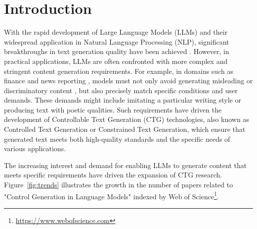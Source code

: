 \documentclass[acmsmall, screen]{acmart}
\begin{document}



\maketitle

\section{Introduction}

With the rapid development of Large Language Models (LLMs) and their widespread application in Natural Language Processing (NLP), significant breakthroughs in text generation quality have been achieved \cite{zhao_arxiv23_LLMSurvey}. However, in practical applications, LLMs are often confronted with more complex and stringent content generation requirements. For example, in domains such as finance \cite{lee_arxiv24_surveyFinLLMs} and news reporting \cite{liang_arxiv24_UHGEval}, models must not only avoid generating misleading or discriminatory content \cite{bender_FACCT21_dangers}, but also precisely match specific conditions and user demands. These demands might include imitating a particular writing style or producing text with poetic qualities. Such requirements have driven the development of Controllable Text Generation (CTG) technologies, also known as Controlled Text Generation or Constrained Text Generation, which ensure that generated text meets both high-quality standards and the specific needs of various applications.

The increasing interest and demand for enabling LLMs to generate content that meets specific requirements have driven the expansion of CTG research. Figure~\ref{fig:trends} illustrates the growth in the number of papers related to "Control Generation in Language Models" indexed by Web of Science\footnote{\url{https://www.webofscience.com}}.
\end{document}
